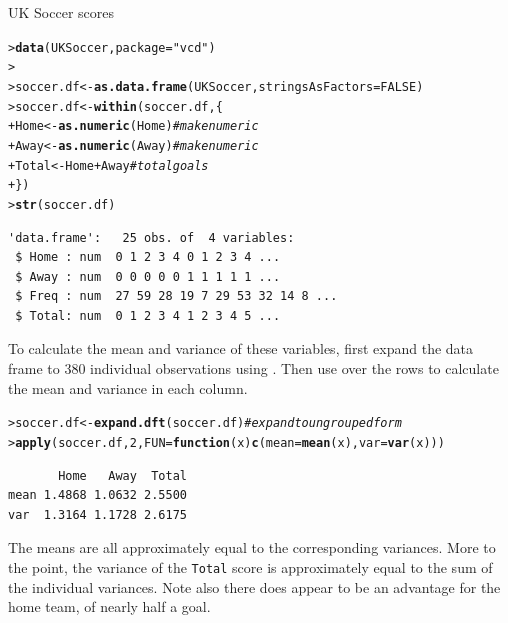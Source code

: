 \documentclass[10pt,krantz2]{krantz}\usepackage[]{graphicx}\usepackage[]{color}
\makeatletter
\newcommand{\hlnum}[1]{\textcolor[rgb]{0.686,0.059,0.569}{#1}}%
\newcommand{\hlstr}[1]{\textcolor[rgb]{0.192,0.494,0.8}{#1}}%
\newcommand{\hlcom}[1]{\textcolor[rgb]{0.678,0.584,0.686}{\textit{#1}}}%
\newcommand{\hlopt}[1]{\textcolor[rgb]{0,0,0}{#1}}%
\newcommand{\hlstd}[1]{\textcolor[rgb]{0.345,0.345,0.345}{#1}}%
\newcommand{\hlkwa}[1]{\textcolor[rgb]{0.161,0.373,0.58}{\textbf{#1}}}%
\newcommand{\hlkwb}[1]{\textcolor[rgb]{0.69,0.353,0.396}{#1}}%
\newcommand{\hlkwc}[1]{\textcolor[rgb]{0.333,0.667,0.333}{#1}}%
\newcommand{\hlkwd}[1]{\textcolor[rgb]{0.737,0.353,0.396}{\textbf{#1}}}%
\newenvironment{kframe}{%
 \def\at@end@of@kframe{}%
 \ifinner\ifhmode%
  \def\at@end@of@kframe{\end{minipage}}%
  \begin{minipage}{\columnwidth}%
 \fi\fi%
 \def\FrameCommand##1{\hskip\@totalleftmargin \hskip-\fboxsep
 \colorbox{shadecolor}{##1}\hskip-\fboxsep
     \hskip-\linewidth \hskip-\@totalleftmargin \hskip\columnwidth}%
 \MakeFramed {\advance\hsize-\width
   \@totalleftmargin\z@ \linewidth\hsize
   \@setminipage}}%
 {\par\unskip\endMakeFramed%
 \at@end@of@kframe}
\newenvironment{knitrout}{}{} %
\renewenvironment{knitrout}{\small\renewcommand{\baselinestretch}{.85}}{} %
\makeatother
\begin{document}
\begin{Example}[soccer]{UK Soccer scores}
\begin{knitrout}
\color{fgcolor}\begin{kframe}
\begin{alltt}
\hlstd{> }\hlkwd{data}\hlstd{(UKSoccer,} \hlkwc{package} \hlstd{=} \hlstr{"vcd"}\hlstd{)}
\hlstd{> }
\hlstd{> }\hlstd{soccer.df} \hlkwb{<-} \hlkwd{as.data.frame}\hlstd{(UKSoccer,} \hlkwc{stringsAsFactors} \hlstd{=} \hlnum{FALSE}\hlstd{)}
\hlstd{> }\hlstd{soccer.df} \hlkwb{<-} \hlkwd{within}\hlstd{(soccer.df, \{}
\hlstd{+ }  \hlstd{Home} \hlkwb{<-} \hlkwd{as.numeric}\hlstd{(Home)}       \hlcom{# make numeric}
\hlstd{+ }  \hlstd{Away} \hlkwb{<-} \hlkwd{as.numeric}\hlstd{(Away)}       \hlcom{# make numeric}
\hlstd{+ }  \hlstd{Total} \hlkwb{<-} \hlstd{Home} \hlopt{+} \hlstd{Away}           \hlcom{# total goals}
\hlstd{+ }\hlstd{\})}
\hlstd{> }\hlkwd{str}\hlstd{(soccer.df)}
\end{alltt}
\begin{verbatim}
'data.frame':	25 obs. of  4 variables:
 $ Home : num  0 1 2 3 4 0 1 2 3 4 ...
 $ Away : num  0 0 0 0 0 1 1 1 1 1 ...
 $ Freq : num  27 59 28 19 7 29 53 32 14 8 ...
 $ Total: num  0 1 2 3 4 1 2 3 4 5 ...
\end{verbatim}
\end{kframe}
\end{knitrout}
To calculate the mean and variance of these variables, first expand
the data frame to 380 individual observations using .
Then use  over the rows to calculate the mean and variance
in each column.
\begin{knitrout}
\color{fgcolor}\begin{kframe}
\begin{alltt}
\hlstd{> }\hlstd{soccer.df} \hlkwb{<-} \hlkwd{expand.dft}\hlstd{(soccer.df)}   \hlcom{# expand to ungrouped form}
\hlstd{> }\hlkwd{apply}\hlstd{(soccer.df,} \hlnum{2}\hlstd{,} \hlkwc{FUN} \hlstd{=} \hlkwa{function}\hlstd{(}\hlkwc{x}\hlstd{)} \hlkwd{c}\hlstd{(}\hlkwc{mean} \hlstd{=} \hlkwd{mean}\hlstd{(x),} \hlkwc{var} \hlstd{=} \hlkwd{var}\hlstd{(x)))}
\end{alltt}
\begin{verbatim}
       Home   Away  Total
mean 1.4868 1.0632 2.5500
var  1.3164 1.1728 2.6175
\end{verbatim}
\end{kframe}
\end{knitrout}

The means are all approximately equal to the corresponding variances.
More to the point, the variance of the \texttt{Total} score
is approximately equal to the sum of the individual variances.
Note also there does appear to be an advantage for the home team,
of nearly half a goal.

\end{Example}
\end{document}
